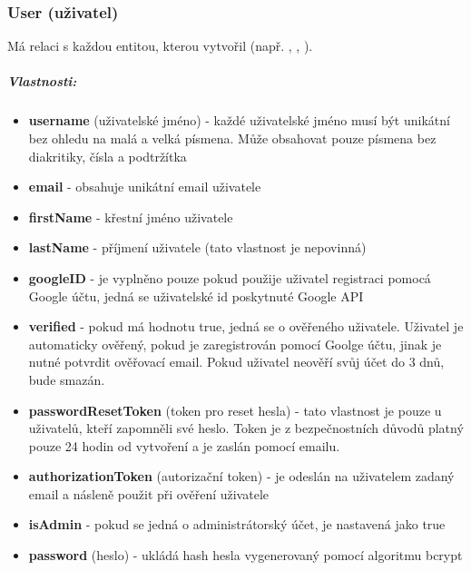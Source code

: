 \documentclass[12pt, a4paper,
 twoside,        %
 openright
]{report}
\newenvironment{propertiesItemize}{
  \begin{itemize}  \begin{itemize}{ 
  }}
  {\end{itemize}\end{itemize}}
\begin{document}
    	            \subsubsection{User (uživatel)}  Má relaci  s každou entitou, kterou vytvořil (např. , , ).
                         \subparagraph{Vlastnosti:}  
                           \begin{propertiesItemize}
                                \item \textbf{username} (uživatelské jméno) - každé uživatelské jméno musí být unikátní bez ohledu na malá a velká písmena. Může obsahovat pouze písmena bez diakritiky, čísla a podtržítka
                                \item \textbf{email} - obsahuje unikátní email uživatele
                                \item \textbf{firstName} - křestní jméno uživatele
                                \item \textbf{lastName} - příjmení uživatele (tato vlastnost je nepovinná)
                                \item \textbf{googleID} - je vyplněno pouze pokud použije uživatel registraci pomocá Google účtu, jedná se uživatelské id poskytnuté Google API 
                                \item \textbf{verified} - pokud má hodnotu true, jedná se o ověřeného uživatele. Uživatel je automaticky ověřený, pokud je zaregistrován pomocí Goolge účtu, jinak je nutné potvrdit ověřovací email. Pokud uživatel neověří svůj účet do 3 dnů, bude smazán. 
                                \item \textbf{passwordResetToken} (token pro reset hesla) - tato vlastnost je pouze u uživatelů, kteří zapomněli své heslo. Token je z bezpečnostních důvodů platný pouze 24 hodin od vytvoření a je zaslán pomocí emailu.  
                                \item \textbf{authorizationToken} (autorizační token) - je odeslán na uživatelem zadaný email a násleně použit při ověření uživatele
                                \item \textbf{isAdmin} - pokud se jedná o administrátorský účet, je nastavená jako true
                                \item \textbf{password} (heslo) - ukládá hash hesla vygenerovaný pomocí algoritmu bcrypt
                        \end{propertiesItemize}
\end{document}
